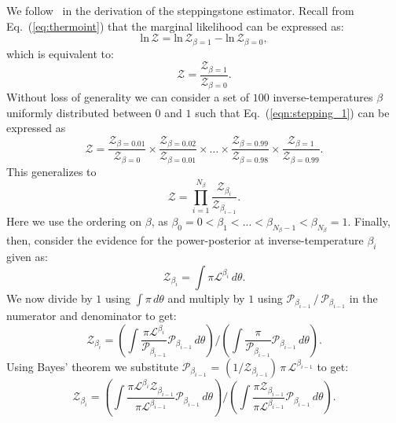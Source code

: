 We follow~\cite{annis2019thermodynamic} in the derivation of the steppingstone estimator. Recall from Eq.~(\ref{eq:thermoint}) that the marginal likelihood can be expressed as:
\begin{equation}
    \mathrm{ln} \, \mathcal{Z} = \mathrm{ln} \, \mathcal{Z}_{\beta=1} - \mathrm{ln} \, \mathcal{Z}_{\beta=0},
\end{equation}
which is equivalent to:
\begin{equation}\label{eqn:stepping_1}
    \mathcal{Z} = \frac{\mathcal{Z}_{\beta=1}}{\mathcal{Z}_{\beta=0}}.
\end{equation}
Without loss of generality we can consider a set of $100$ inverse-temperatures $\beta$ uniformly distributed between $0$ and $1$ such that Eq.~(\ref{eqn:stepping_1}) can be expressed as
\begin{equation}
    \mathcal{Z} = \frac{\mathcal{Z}_{\beta = 0.01}} {\mathcal{Z}_{\beta = 0}}  
    \times \frac{\mathcal{Z}_{\beta = 0.02}} {\mathcal{Z}_{\beta = 0.01}}
    \times \ldots \times \frac{\mathcal{Z}_{\beta = 0.99}} {\mathcal{Z}_{\beta = 0.98}} \times \frac{\mathcal{Z}_{\beta = 1}} {\mathcal{Z}_{\beta = 0.99}}.
\end{equation}
This generalizes to
\begin{equation}\label{eqn:ssa_prod_series}
     \mathcal{Z} = \prod_{i=1}^{N_\beta} \frac{\mathcal{Z}_{\beta_{i}}}{\mathcal{Z}_{\beta_{i-1}}}.
\end{equation}
Here we use the ordering on $\beta$, as $\beta_0=0 < \beta_1 < ... < \beta_{N_\beta -1} < \beta_{N_\beta} = 1$. Finally, then, consider the evidence for the power-posterior at inverse-temperature $\beta_i$ given as:
\begin{equation}
    \mathcal{Z}_{\beta_i} = \int \pi \mathcal{L}^{\beta_i} \, d\theta.
\end{equation}
We now divide by $1$ using $\int \pi \, d\theta$ and multiply by $1$ using $\mathcal{P}_{\beta_{i-1}} \, / \, \mathcal{P}_{\beta_{i-1}}$ in the numerator and denominator to get:
\begin{equation}
    \mathcal{Z}_{\beta_i} = \left(\int \frac{\pi \mathcal{L}^{\beta_i}}{\mathcal{P}_{\beta_{i-1}}} \mathcal{P}_{\beta_{i-1}} \, d\theta \right )\bigg / \left( \int \frac{\pi}{\mathcal{P}_{\beta_{i-1}}} \mathcal{P}_{\beta_{i-1}} \, d\theta \right).
\end{equation}
Using Bayes' theorem we substitute $\mathcal{P}_{\beta_{i-1}}$ = $(1/\mathcal{Z}_{\beta_{i-1}}) \, \pi \, \mathcal{L}^{\beta_{i-1}}$ to get:
\begin{equation}
    \mathcal{Z}_{\beta_i} = \left (\int \frac{\pi \mathcal{L}^{\beta_i} \mathcal{Z}_{\beta_{i-1}}}{\pi \mathcal{L}^{\beta_{i-1}}} \mathcal{P}_{\beta_{i-1}} \, d\theta \right) \bigg / \left(\int \frac{\pi \mathcal{Z}_{\beta_{i-1}}}{\pi \mathcal{L}^{\beta_{i-1}}} \mathcal{P}_{\beta_{i-1}} \, d\theta\right).
\end{equation}
